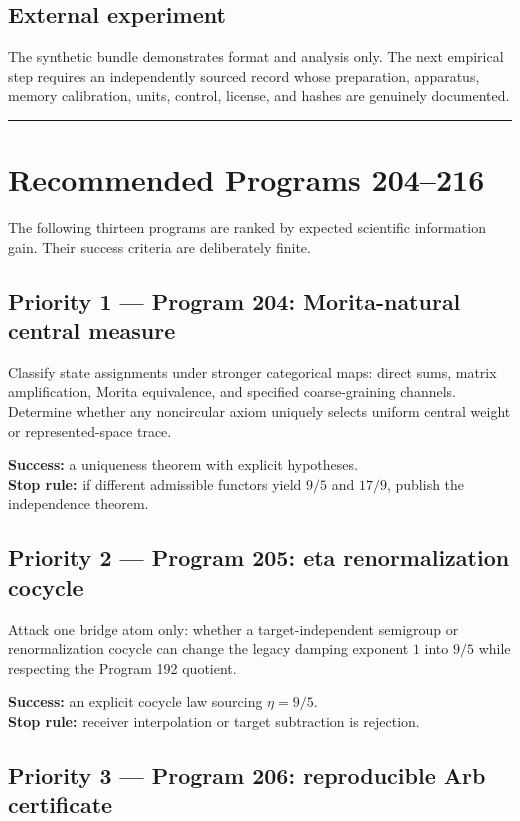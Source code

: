 \documentclass[11pt,a4paper,openany]{report}
\begin{document}
\section{External experiment}

The synthetic bundle demonstrates format and analysis only. The next empirical step requires an independently sourced record whose preparation, apparatus, memory calibration, units, control, license, and hashes are genuinely documented.

\par\medskip\hrule\medskip

\chapter{Recommended Programs 204--216}

The following thirteen programs are ranked by expected scientific information gain. Their success criteria are deliberately finite.

\section{Priority 1 --- Program 204: Morita-natural central measure}

Classify state assignments under stronger categorical maps: direct sums, matrix amplification, Morita equivalence, and specified coarse-graining channels. Determine whether any noncircular axiom uniquely selects uniform central weight or represented-space trace.

\textbf{Success:} a uniqueness theorem with explicit hypotheses.\\
\textbf{Stop rule:} if different admissible functors yield \(9/5\) and \(17/9\), publish the independence theorem.

\section{Priority 2 --- Program 205: eta renormalization cocycle}

Attack one bridge atom only: whether a target-independent semigroup or renormalization cocycle can change the legacy damping exponent \(1\) into \(9/5\) while respecting the Program 192 quotient.

\textbf{Success:} an explicit cocycle law sourcing \(\eta=9/5\).\\
\textbf{Stop rule:} receiver interpolation or target subtraction is rejection.

\section{Priority 3 --- Program 206: reproducible Arb certificate}
\end{document}
